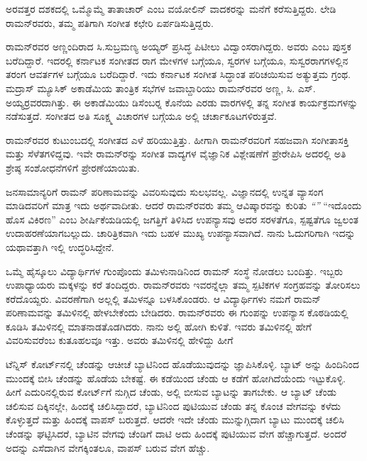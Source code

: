 ಅರವತ್ತರ ದಶಕದಲ್ಲಿ ಒಮ್ಮೊಮ್ಮೆ ತಾತಾಚಾರ್ ಎಂಬ ವಯೋಲಿನ್ ವಾದಕರನ್ನು ಮನೆಗೆ ಕರೆಸುತ್ತಿದ್ದರು. ಲೇಡಿ ರಾಮನ್‍ರವರು, ತಮ್ಮ ಪತಿಗಾಗಿ ಸಂಗೀತ ಕಛೇರಿ ಏರ್ಪಡಿಸುತ್ತಿದ್ದರು.

ರಾಮನ್‍ರವರ ಅಣ್ಣಂದಿರಾದ ಸಿ.ಸುಬ್ರಮಣ್ಯ ಅಯ್ಯರ್ ಪ್ರಸಿದ್ಧ ಪಿಟೀಲು ವಿದ್ವಾಂಸರಾಗಿದ್ದರು. ಅವರು \textit{} ಎಂಬ ಪುಸ್ತಕ ಬರೆದಿದ್ದಾರೆ. ಇದರಲ್ಲಿ ಕರ್ನಾಟಕ ಸಂಗೀತದ ರಾಗ ಮೇಳಗಳ ಬಗ್ಗೆಯೂ, ಸ್ವರಗಳ ಬಗ್ಗೆಯೂ, ಸುಸ್ವರರಾಗಗಳಲ್ಲಿನ ತರಂಗ ಆವರ್ತಗಳ ಬಗ್ಗೆಯೂ ಬರೆದಿದ್ದಾರೆ. ಇದು ಕರ್ನಾಟಕ ಸಂಗೀತ ಸಿದ್ಧಾಂತ ಪರಿಚಯಿಸುವ ಅತ್ಯುತ್ತಮ ಗ್ರಂಥ. ಮದ್ರಾಸ್ ಮ್ಯೂಸಿಕ್ ಅಕಾಡೆಮಿಯ ತಾಂತ್ರಿಕ ಸಭೆಗಳ ಜವಾಬ್ದಾರಿಯು ರಾಮನ್‍ರವರ ಅಣ್ಣ, ಸಿ. ಎಸ್. ಅಯ್ಯರ್‍ರವರದಾಗಿತ್ತು. ಈ ಅಕಾಡೆಮಿಯು ಡಿಸೆಂಬರ್‍ನ ಕೊನೆಯ ಎರಡು ವಾರಗಳಲ್ಲಿ ತನ್ನ ಸಂಗೀತ ಕಾರ್ಯಕ್ರಮಗಳನ್ನು ನಡೆಸುತ್ತದೆ. ಸಂಗೀತದ ಅತಿ ಸೂಕ್ಷ್ಮ ವಿಚಾರಗಳ ಬಗ್ಗೆಯೂ ಅಲ್ಲಿ ಚರ್ಚಾಕೂಟಗಳಿರುತ್ತವೆ.

ರಾಮನ್‍ರವರ ಕುಟುಂಬದಲ್ಲಿ ಸಂಗೀತದ ಎಳೆ ಹರಿಯುತ್ತಿತ್ತು. ಹೀಗಾಗಿ ರಾಮನ್‍ರವರಿಗೆ ಸಹಜವಾಗಿ ಸಂಗೀತಾಸಕ್ತಿ ಮತ್ತು ಸೆಳೆತಗಳಿದ್ದವು. ಇವೇ ರಾಮನ್‍ರನ್ನು ಸಂಗೀತ ವಾದ್ಯಗಳ ವೈಜ್ಞಾನಿಕ ವಿಶ್ಲೇಷಣೆಗೆ ಪ್ರೇರೇಪಿಸಿ ಅದರಲ್ಲಿ ಅತಿ ಶ್ರೇಷ್ಠ ಸಂಶೋಧನೆಗಳಿಗೆ ಪ್ರೇರಣೆಯಾಯಿತು.



ಜನಸಾಮಾನ್ಯರಿಗೆ ರಾಮನ್ ಪರಿಣಾಮವನ್ನು ವಿವರಿಸುವುದು ಸುಲಭವಲ್ಲ. ವಿಜ್ಞಾನದಲ್ಲಿ ಉನ್ನತ ವ್ಯಾಸಂಗ ಮಾಡಿದವರಿಗೆ ಮಾತ್ರ ಇದು ಅರ್ಥವಾದೀತು. ಆದರೆ ರಾಮನ್‍ರವರು ತಮ್ಮ ಆವಿಷ್ಕಾರವನ್ನು ಕುರಿತು \textit{“”} “ಇದೊಂದು ಹೊಸ ವಿಕಿರಣ” ಎಂಬ ಶೀರ್ಷಿಕೆಯಡಿಯಲ್ಲಿ ಜಗತ್ತಿಗೆ ತಿಳಿಸಿದ ಉಪನ್ಯಾಸವು ಅದರ ಸರಳತೆಗೂ, ಸ್ಪಷ್ಟತೆಗೂ ಜ್ವಲಂತ ಉದಾಹರಣೆಯಾಗಬಲ್ಲುದು. ಚಾರಿತ್ರಿಕವಾಗಿ ಇದು ಬಹಳ ಮುಖ್ಯ ಉಪನ್ಯಾಸವಾಗಿದೆ. ನಾನು ಓದುಗರಿಗಾಗಿ ಇದನ್ನು ಯಥಾವತ್ತಾಗಿ ಇಲ್ಲಿ ಉದ್ಧರಿಸಿದ್ದೇನೆ.

ಒಮ್ಮೆ ಹೈಸ್ಕೂಲು ವಿದ್ಯಾರ್ಥಿಗಳ ಗುಂಪೊಂದು ತಮಿಳುನಾಡಿನಿಂದ ರಾಮನ್ ಸಂಸ್ಥೆ ನೋಡಲು ಬಂದಿತ್ತು. ಇಬ್ಬರು ಉಪಾಧ್ಯಾಯರು  ಮಕ್ಕಳನ್ನು ಕರೆ ತಂದಿದ್ದರು. ರಾಮನ್‍ರವರು ಇವರನ್ನೆಲ್ಲಾ ತಮ್ಮ ಸ್ಪಟಿಕಗಳ ಸಂಗ್ರಹವನ್ನು ತೋರಿಸಲು ಕರೆದೊಯ್ದರು. ವಿವರಣೆಗಾಗಿ ಅಲ್ಲಲ್ಲಿ ತಮಿಳನ್ನೂ ಬಳಸಿಕೊಂಡರು. ಆ ವಿದ್ಯಾರ್ಥಿಗಳು ನಮಗೆ ರಾಮನ್ ಪರಿಣಾಮವನ್ನು ತಮಿಳಿನಲ್ಲಿ ಹೇಳಬೇಕೆಂದು ಬೇಡಿದರು. ರಾಮನ್‍ರವರು ಈ ಗುಂಪನ್ನು ಉಪನ್ಯಾಸ ಕೊಠಡಿಯಲ್ಲಿ ಕೂಡಿಸಿ ತಮಿಳಿನಲ್ಲಿ ಮಾತನಾಡತೊಡಗಿದರು. ನಾನು ಅಲ್ಲಿ ಹೋಗಿ ಕುಳಿತೆ. ಇವರು ತಮಿಳಿನಲ್ಲಿ ಹೇಗೆ ವಿವರಿಸುವರೆಂಬ ಕುತೂಹಲವೂ ಇತ್ತು. ಅವರು ತಮಿಳಿನಲ್ಲಿ ಹೇಳಿದ್ದು ಹೀಗೆ

\enginline{-}ಟೆನ್ನಿಸ್ ಕೋರ್ಟ್‌ನಲ್ಲಿ ಚೆಂಡನ್ನು ಆಚೀಚೆ ಬ್ಯಾಟಿನಿಂದ ಹೊಡೆಯುವುದನ್ನು ಜ್ಞಾಪಿಸಿಕೊಳ್ಳಿ. ಬ್ಯಾಟ್ ಅನ್ನು ಹಿಂದಿನಿಂದ ಮುಂದಕ್ಕೆ ಬೀಸಿ ಚೆಂಡನ್ನು ಹೊಡೆಯ ಬೇಕಷ್ಟೆ. ಈ ಕಡೆಯಿಂದ ಚೆಂಡು ಆ ಕಡೆಗೆ ಹೋಗಿದೆಯೆಂದು ಇಟ್ಟುಕೊಳ್ಳಿ. ಹೀಗೆ ಎದುರಿನಲ್ಲಿರುವ ಕೋರ್ಟ್‌ಗೆ ನುಗ್ಗಿದ ಚೆಂಡು, ಅಲ್ಲಿ ಬೀಸುವ ಬ್ಯಾಟನ್ನು ತಾಗಬೇಕು. ಆ ಬ್ಯಾಟ್ ಚೆಂಡು ಚಲಿಸುವ ದಿಕ್ಕಿನಲ್ಲೇ, ಹಿಂದಕ್ಕೆ ಚಲಿಸಿದ್ದಾದರೆ, ಬ್ಯಾಟಿನಿಂದ ಪುಟಿಯುವ ಚೆಂಡು ತನ್ನ ಕೊಂಚ ವೇಗವನ್ನು ಕಳೆದು ಕೊಳ್ಳುತ್ತದೆ ಮತ್ತು ಹಿಂದಕ್ಕೆ ವಾಪಸ್ ಬರುತ್ತದೆ. ಆದರೇ ಇದೇ ಚೆಂಡು ಮುನ್ನುಗ್ಗಿದಾಗ ಬ್ಯಾಟು ಮುಂದಕ್ಕೆ ಚಲಿಸಿ ಚೆಂಡನ್ನು ಘಟ್ಟಿಸಿದರೆ, ಬ್ಯಾಟಿನ ವೇಗವು ಚೆಂಡಿಗೆ ದಾಟಿ ಅದು ಹಿಂದಕ್ಕೆ ಪುಟಿಯುವ ವೇಗ ಹೆಚ್ಚಾಗುತ್ತದೆ. ಅಂದರೆ ಅದನ್ನು ಎಸೆದಾಗಿನ ವೇಗಕ್ಕಿಂತಲೂ, ವಾಪಸ್ ಬರುವ ವೇಗ ಹೆಚ್ಚು.

